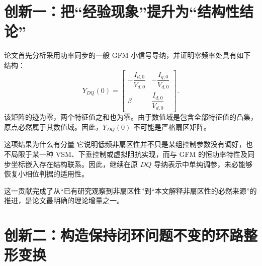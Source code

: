 \documentclass[11pt,a4paper]{ctexart}
\begin{document}
\section{创新一：把“经验现象”提升为“结构性结论”}

论文首先分析采用功率同步的一般 GFM 小信号导纳，并证明零频率处具有如下结构：
\begin{equation}
Y_{DQ}(0)=
\begin{bmatrix}
-\dfrac{I_{d,0}}{V_{d,0}}&-\dfrac{I_{q,0}}{V_{d,0}}\\[2mm]
\beta&\dfrac{I_{d,0}}{V_{d,0}}
\end{bmatrix}.
\end{equation}
该矩阵的迹为零，两个特征值之和也为零。由于数值域是包含全部特征值的凸集，原点必然属于其数值域。因此，$Y_{DQ}(0)$ 不可能是严格扇区矩阵。

\begin{claimbox}{这项结果为什么有分量}
它说明低频非扇区性并不只是某组控制参数没有调好，也不局限于某一种 VSM、下垂控制或虚拟阻抗实现，而与 GFM 的恒功率特性及同步坐标嵌入存在结构联系。因此，继续在原 $DQ$ 导纳表示中单纯调参，未必能够恢复小相位判据的适用性。
\end{claimbox}

这一贡献完成了从“已有研究观察到非扇区性”到“本文解释非扇区性的必然来源”的推进，是论文最明确的理论增量之一。

\section{创新二：构造保持闭环问题不变的环路整形变换}
\end{document}
